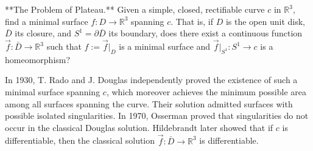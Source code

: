 **The Problem of Plateau.** Given a simple, closed, rectifiable curve $c$ in $\mathbb{R}^3$, find a minimal surface $f: D \to \mathbb{R}^3$ spanning $c$. That is, if $D$ is the open unit disk, $\bar{D}$ its closure, and $S^1 = \partial \bar{D}$ its boundary, does there exist a continuous function $\vec{f}: \bar{D} \to \mathbb{R}^3$ such that $f := \vec{f}|_D$ is a minimal surface and $\vec{f}|_{S^1}: S^1 \to c$ is a homeomorphism?

In 1930, T. Rado and J. Douglas independently proved the existence of such a minimal surface spanning $c$, which moreover achieves the minimum possible area among all surfaces spanning the curve. Their solution admitted surfaces with possible isolated singularities. In 1970, Osserman proved that singularities do not occur in the classical Douglas solution. Hildebrandt later showed that if $c$ is differentiable, then the classical solution $\vec{f}: \bar{D} \to \mathbb{R}^3$ is differentiable.
